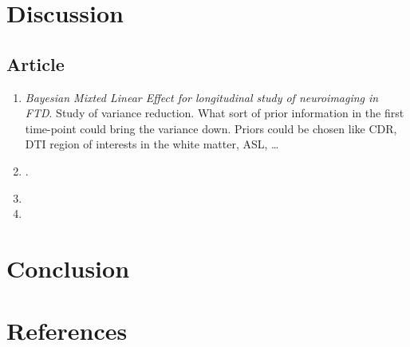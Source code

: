 \documentclass[final, paper=letter,5p,times,twocolumn]{elsarticle}
\theoremstyle{definition}
\begin{document}
\section{Discussion}

\subsection{Article}

\begin{enumerate}
  \item {\it Bayesian Mixted Linear Effect for longitudinal study of neuroimaging in FTD}. Study of variance reduction. What sort of prior information in the first time-point could bring the variance down. Priors could be chosen like CDR, DTI region of interests in the white matter, ASL, \dots
  \item {\it }.
  \item 
  \item 
\end{enumerate}


\section{Conclusion}

\section*{References}



\end{document}
